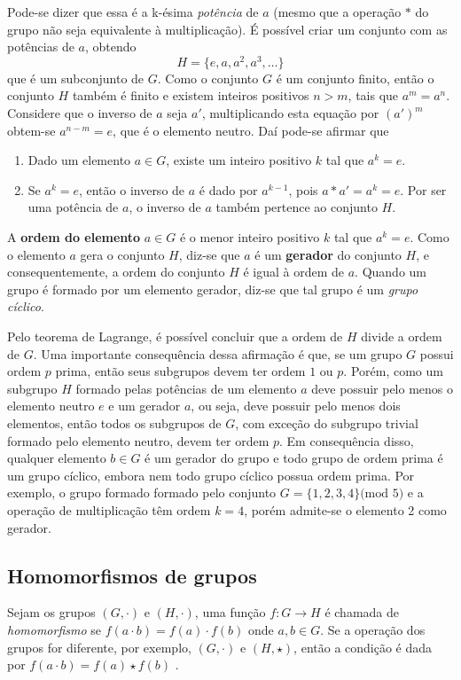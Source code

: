Pode-se dizer que essa é a k-ésima \textit{potência} de $a$ (mesmo que a operação $*$ do grupo não seja equivalente à multiplicação). É possível criar um conjunto com as potências de $a$, obtendo
$$
H = \{e, a, a^2, a^3, \ldots\}
$$
que é um subconjunto de $G$. Como o conjunto $G$ é um conjunto finito, então o conjunto $H$ também é finito e existem inteiros positivos $n > m$, tais que $a^m = a^n$. Considere que o inverso de $a$ seja $a'$, multiplicando esta equação por $(a')^m$ obtem-se $a^{n-m} = e$, que é o elemento neutro.\cite{Coutinho:2014} Daí pode-se afirmar que
\begin{enumerate}
\item Dado um elemento $a \in G$, existe um inteiro positivo $k$ tal que $a^k = e$.
\item Se $a^k = e$, então o inverso de $a$ é dado por $a^{k-1}$, pois $a * a' = a^k = e$. Por ser uma potência de $a$, o inverso de $a$ também pertence ao conjunto $H$.
\end{enumerate}

A \textbf{ordem do elemento} $a \in G$ é o menor inteiro positivo $k$ tal que $a^k = e$. Como o elemento $a$ gera o conjunto $H$, diz-se que $a$ é um \textbf{gerador} do conjunto $H$, e consequentemente, a ordem do conjunto $H$ é igual à ordem de $a$. Quando um grupo é formado por um elemento gerador, diz-se que tal grupo é um \textit{grupo cíclico}. \cite{Coutinho:2014}

Pelo teorema de Lagrange, é possível concluir que a ordem de $H$ divide a ordem de $G$. Uma importante consequência dessa afirmação é que, se um grupo $G$ possui ordem $p$ prima, então seus subgrupos devem ter ordem $1$ ou $p$. Porém, como um subgrupo $H$ formado pelas potências de um elemento $a$ deve possuir pelo menos o elemento neutro $e$ e um gerador $a$, ou seja, deve possuir pelo menos dois elementos, então todos os subgrupos de $G$, com exceção do subgrupo trivial formado pelo elemento neutro, devem ter ordem $p$. Em consequência disso, qualquer elemento $b \in G$ é um gerador do grupo e todo grupo de ordem prima é um grupo cíclico, embora nem todo grupo cíclico possua ordem prima. Por exemplo, o grupo formado formado pelo conjunto $G=\{1,2,3,4\} \mbox{(mod 5)}$ e a operação de multiplicação têm ordem $k = 4$, porém admite-se o elemento 2 como gerador. \cite{Coutinho:2014}

%
%
\subsection{Homomorfismos de grupos}
Sejam os grupos $(G, \cdot)$ e $(H, \cdot)$, uma função $f: G \rightarrow H$ é chamada de \textit{homomorfismo} se $f(a \cdot b) = f(a) \cdot f(b)$ onde $a, b \in G$. Se a operação dos grupos for diferente, por exemplo, $(G, \cdot)$ e $(H, \star)$, então a condição é dada por $f(a \cdot b) = f(a) \star f(b)$ \cite{Gilbert:2004}.

